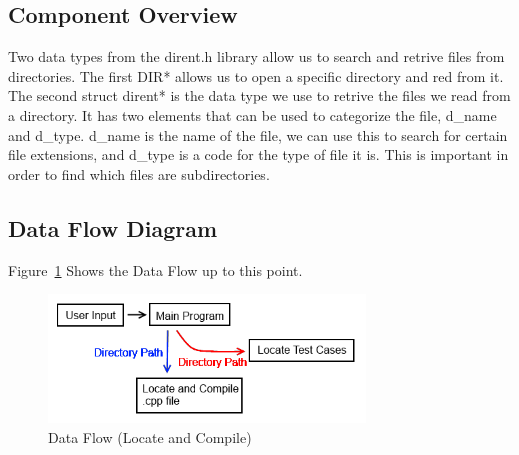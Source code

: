 \subsection{Component  Overview}
Two data types from the dirent.h library allow us to search and retrive files from directories.  The first DIR* allows us to open
a specific directory and red from it.  The second struct dirent* is the data type we use to retrive the files we read from a directory.
It has two elements that can be used to categorize the file, d\_name and d\_type.  d\_name is the name of the file, we can use this
to search for certain file extensions, and d\_type is a code for the type of file it is.  This is important in order to find which files are
subdirectories. 

\subsection{Data Flow Diagram}
Figure~\ref{DataFlow2} Shows the Data Flow up to this point.

\begin{figure}[tbh]
\begin{center}
\includegraphics[width=0.75\textwidth]{./DataFlow2}
\end{center}
\caption{Data Flow (Locate and Compile) \label{DataFlow2}}
\end{figure}


